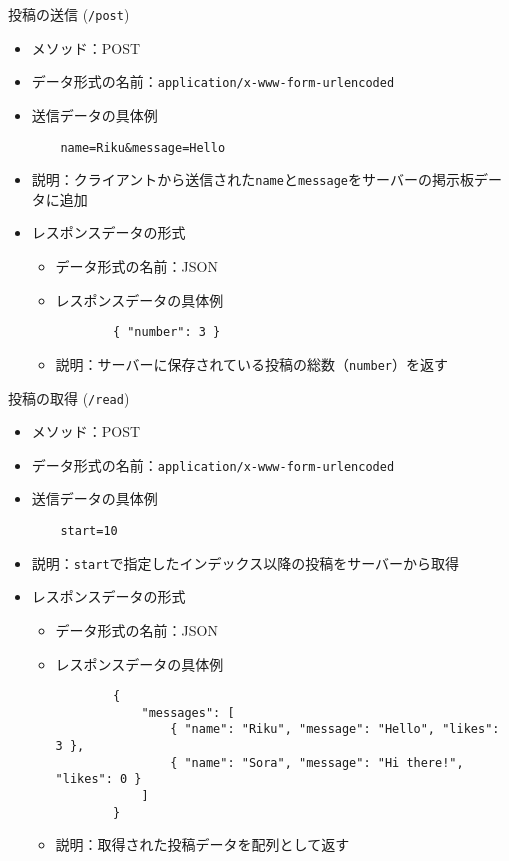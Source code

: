 \documentclass[uplatex,dvipdfmx]{jsarticle}
\begin{document}
投稿の送信 (\texttt{/post})
\begin{itemize}
    \item メソッド：POST
    \item データ形式の名前：\texttt{application/x-www-form-urlencoded}
    \item 送信データの具体例
    \begin{verbatim}
    name=Riku&message=Hello
    \end{verbatim}
    \item 説明：クライアントから送信された\texttt{name}と\texttt{message}をサーバーの掲示板データに追加
    \item レスポンスデータの形式
    \begin{itemize}
        \item データ形式の名前：JSON
        \item レスポンスデータの具体例
        \begin{verbatim}
        { "number": 3 }
        \end{verbatim}
        \item 説明：サーバーに保存されている投稿の総数（\texttt{number}）を返す
    \end{itemize}
\end{itemize}

投稿の取得 (\texttt{/read})
\begin{itemize}
    \item メソッド：POST
    \item データ形式の名前：\texttt{application/x-www-form-urlencoded}
    \item 送信データの具体例
    \begin{verbatim}
    start=10
    \end{verbatim}
    \item 説明：\texttt{start}で指定したインデックス以降の投稿をサーバーから取得
    \item レスポンスデータの形式
    \begin{itemize}
        \item データ形式の名前：JSON
        \item レスポンスデータの具体例
        \begin{verbatim}
        {
            "messages": [
                { "name": "Riku", "message": "Hello", "likes": 3 },
                { "name": "Sora", "message": "Hi there!", "likes": 0 }
            ]
        }
        \end{verbatim}
        \item 説明：取得された投稿データを配列として返す
    \end{itemize}
\end{itemize}
\end{document}
